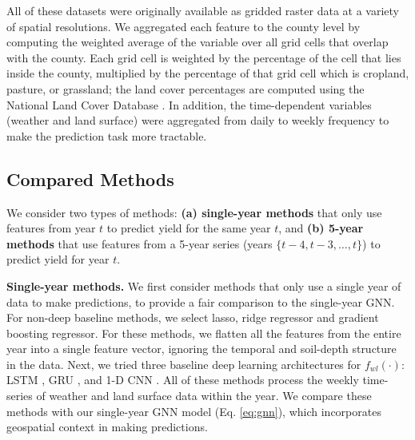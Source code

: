 All of these datasets were originally available as gridded raster data at a variety of spatial resolutions. We aggregated each feature to the county level by computing the weighted average of the variable over all grid cells that overlap with the county. Each grid cell is weighted by the percentage of the cell that lies inside the county, multiplied by the percentage of that grid cell which is cropland, pasture, or grassland; the land cover percentages are computed using the National Land Cover Database \cite{nlcd}. In addition, the time-dependent variables (weather and land surface) were aggregated from daily to weekly frequency to make the prediction task more tractable.



\subsection{Compared Methods}

We consider two types of methods: \textbf{(a) single-year methods} that only use features from year $t$ to predict yield for the same year $t$, and \textbf{(b) 5-year methods} that use features from a 5-year series (years $\{t-4, t-3, \dots, t\}$) to predict yield for year $t$.

\textbf{Single-year methods.} We first consider methods that only use a single year of data to make predictions, to provide a fair comparison to the single-year GNN. For non-deep baseline methods, we select lasso, ridge regressor and gradient boosting regressor. For these methods, we flatten all the features from the entire year into a single feature vector, ignoring the temporal and soil-depth structure in the data.
Next, we tried three baseline deep learning architectures for $f_{wl}(\cdot)$: LSTM \cite{hochreiter1997long}, GRU \cite{chung2014empirical}, and 1-D CNN \cite{kalchbrenner2014convolutional}. All of these methods process the weekly time-series of weather and land surface data within the year. We compare these methods with our single-year GNN model (Eq. \ref{eq:gnn}), which incorporates geospatial context in making predictions.
 
